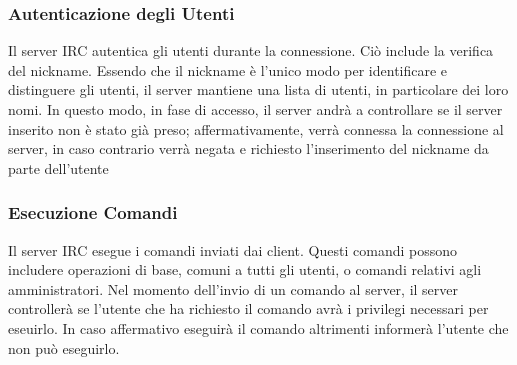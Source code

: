 \subsubsection{Autenticazione degli Utenti}
Il server IRC autentica gli utenti durante la connessione. Ciò include la verifica del nickname. Essendo che il nickname è l'unico modo per identificare e distinguere gli utenti, il server mantiene una lista di utenti, in particolare dei loro nomi. In questo modo, in fase di accesso, il server andrà a controllare se il server inserito non è stato già preso; affermativamente, verrà connessa la connessione al server, in caso contrario verrà negata e richiesto l'inserimento del nickname da parte dell'utente

\subsubsection{Esecuzione Comandi}
Il server IRC esegue i comandi inviati dai client. Questi comandi possono includere operazioni di base, comuni a tutti gli utenti, o comandi relativi agli amministratori. Nel momento dell'invio di un comando al server, il server controllerà se l'utente che ha richiesto il comando avrà i privilegi necessari per eseuirlo. In caso affermativo eseguirà il comando altrimenti informerà l'utente che non può eseguirlo.
